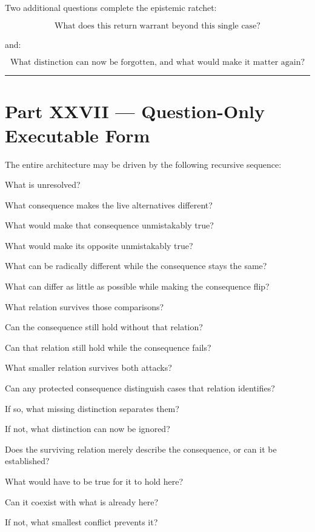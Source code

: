 \documentclass[
]{article}
\begin{document}
Two additional questions complete the epistemic ratchet:

\[
\boxed{
\text{What does this return warrant beyond this single case?}
}
\]

and:

\[
\boxed{
\text{What distinction can now be forgotten, and what would make it matter again?}
}
\]

\begin{center}\rule{0.5\linewidth}{0.5pt}\end{center}

\section{Part XXVII --- Question-Only Executable
Form}\label{part-xxvii-question-only-executable-form}

The entire architecture may be driven by the following recursive
sequence:

What is unresolved?

What consequence makes the live alternatives different?

What would make that consequence unmistakably true?

What would make its opposite unmistakably true?

What can be radically different while the consequence stays the same?

What can differ as little as possible while making the consequence flip?

What relation survives those comparisons?

Can the consequence still hold without that relation?

Can that relation still hold while the consequence fails?

What smaller relation survives both attacks?

Can any protected consequence distinguish cases that relation
identifies?

If so, what missing distinction separates them?

If not, what distinction can now be ignored?

Does the surviving relation merely describe the consequence, or can it
be established?

What would have to be true for it to hold here?

Can it coexist with what is already here?

If not, what smallest conflict prevents it?
\end{document}
